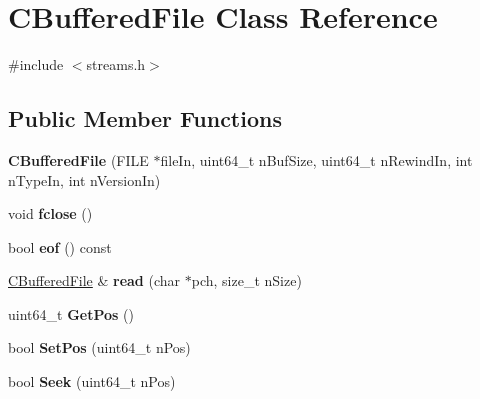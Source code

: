 \hypertarget{class_c_buffered_file}{}\section{C\+Buffered\+File Class Reference}
\label{class_c_buffered_file}


{\ttfamily \#include $<$streams.\+h$>$}

\subsection*{Public Member Functions}
\begin{DoxyCompactItemize}
\item 
\mbox{\label{class_c_buffered_file_a30ad96a8d09bed60355d1fadda7dabdc}} 
{\bfseries C\+Buffered\+File} (F\+I\+LE $\ast$file\+In, uint64\+\_\+t n\+Buf\+Size, uint64\+\_\+t n\+Rewind\+In, int n\+Type\+In, int n\+Version\+In)
\item 
\mbox{\label{class_c_buffered_file_aef8c993fe3eb0fa423d09d095f40dcf6}} 
void {\bfseries fclose} ()
\item 
\mbox{\label{class_c_buffered_file_af0ff112a5fd46ba3e8f2f1f4f36d5566}} 
bool {\bfseries eof} () const
\item 
\mbox{\label{class_c_buffered_file_a20c6d2a4dbc69a8e5c7ba766d04b3d85}} 
\mbox{\hyperlink{class_c_buffered_file}{C\+Buffered\+File}} \& {\bfseries read} (char $\ast$pch, size\+\_\+t n\+Size)
\item 
\mbox{\label{class_c_buffered_file_af9e7226e682ede9c1c141fb2972afd7b}} 
uint64\+\_\+t {\bfseries Get\+Pos} ()
\item 
\mbox{\label{class_c_buffered_file_aac4029a9aade127cc8a1fbbcc1549599}} 
bool {\bfseries Set\+Pos} (uint64\+\_\+t n\+Pos)
\item 
\mbox{\label{class_c_buffered_file_afbf9abcc70f24824661aec96a4310a63}} 
bool {\bfseries Seek} (uint64\+\_\+t n\+Pos)
\item 
\mbox{\label{class_c_buffered_file_adfcf370a41be0454e0f6b3dc358e415c}} 

\end{DoxyCompactItemize}
